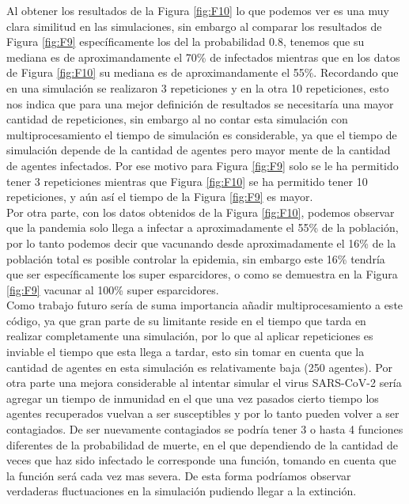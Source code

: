 \documentclass[final,6p,times,twocolumn]{elsarticle}
\begin{document}
Al obtener los resultados de la Figura \ref{fig:F10} lo que podemos ver es una muy clara similitud en las simulaciones, sin embargo al comparar los resultados de Figura \ref{fig:F9} específicamente los del la probabilidad 0.8, tenemos que su mediana es de aproximandamente el 70\% de infectados mientras que en los datos de Figura \ref{fig:F10} su mediana es de aproximandamente el 55\%. Recordando que en una simulación se realizaron 3 repeticiones y en la otra 10 repeticiones, esto nos indica que para una mejor definición de resultados se necesitaría una mayor cantidad de repeticiones, sin embargo al no contar esta simulación con multiprocesamiento el tiempo de simulación es considerable, ya que el tiempo de simulación depende de la cantidad de agentes pero mayor mente de la cantidad de agentes infectados. Por ese motivo para Figura \ref{fig:F9} solo se le ha permitido tener 3 repeticiones mientras que Figura \ref{fig:F10} se ha permitido tener 10 repeticiones, y aún así el tiempo de la Figura \ref{fig:F9} es mayor. \\

Por otra parte, con los datos obtenidos de la Figura \ref{fig:F10}, podemos observar que la pandemia solo llega a infectar a aproximadamente el 55\% de la población, por lo tanto podemos decir que vacunando desde aproximadamente el 16\% de la población total es posible controlar la epidemia, sin embargo este 16\% tendría que ser específicamente los super esparcidores, o como se demuestra en la Figura \ref{fig:F9} vacunar al 100\% super esparcidores. \\

Como trabajo futuro sería de suma importancia añadir multiprocesamiento a este código, ya que gran parte de su limitante reside en el tiempo que tarda en realizar completamente una simulación, por lo que al aplicar repeticiones es inviable el tiempo que esta llega a tardar, esto sin tomar en cuenta que la cantidad de agentes en esta simulación es relativamente baja (250 agentes). Por otra parte una mejora considerable al intentar simular el virus SARS-CoV-2 sería agregar un tiempo de inmunidad en el que una vez pasados cierto tiempo los agentes recuperados vuelvan a ser susceptibles y por lo tanto pueden volver a ser contagiados. De ser nuevamente contagiados se podría tener 3 o hasta 4 funciones diferentes de la probabilidad de muerte, en el que dependiendo de la cantidad de veces que haz sido infectado le corresponde una función, tomando en cuenta que la función será cada vez mas severa. De esta forma podríamos observar verdaderas fluctuaciones en la simulación pudiendo llegar a la extinción.  




\end{document}
